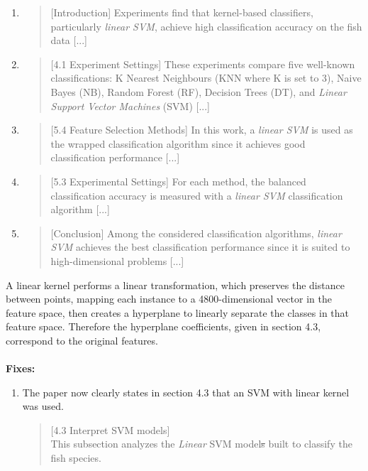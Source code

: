 \documentclass[runningheads]{llncs}
\begin{document}
\begin{enumerate}
  \item 
  \begin{quote}
    [Introduction]
    Experiments find that kernel-based classifiers, particularly \emph{linear SVM}, achieve high classification accuracy on the fish data [...]
  \end{quote}
  \item 
  \begin{quote}
    [4.1 Experiment Settings]
    These experiments compare five well-known classifications: K Nearest Neighbours (KNN where K is set to 3), Naive Bayes (NB), Random Forest (RF), Decision Trees (DT), and \emph{Linear Support Vector Machines} (SVM) [...]
  \end{quote}
  \item 
  \begin{quote}
    [5.4 Feature Selection Methods]
    In this work, a \emph{linear SVM} is used as the wrapped classification algorithm since it achieves good classification performance [...]
  \end{quote}
  \item \begin{quote}
    [5.3 Experimental Settings]
    For each method, the balanced classification accuracy is measured with a \emph{linear SVM} classification algorithm \cite{sklearn2021feature} [...]
  \end{quote}
  \item \begin{quote}
    [Conclusion]
    Among the considered classification algorithms, \emph{linear SVM} achieves the best classification performance since it is suited to high-dimensional problems [...]
  \end{quote}
\end{enumerate}

A linear kernel performs a linear transformation, which preserves the distance between points, mapping each instance to a 4800-dimensional vector in the feature space, then creates a hyperplane to linearly separate the classes in that feature space. Therefore the hyperplane coefficients, given in section 4.3, correspond to the original features.
\\\\
\noindent\textbf{Fixes:}

\begin{enumerate}
  \item The paper now clearly states in section 4.3 that an SVM with linear kernel was used.
    \begin{quote} 
    [4.3 Interpret SVM models] \\
    This subsection analyzes the \emph{Linear} SVM model\sout{s} built to classify the fish species. 
  \end{quote}
\end{enumerate}
\end{document}
